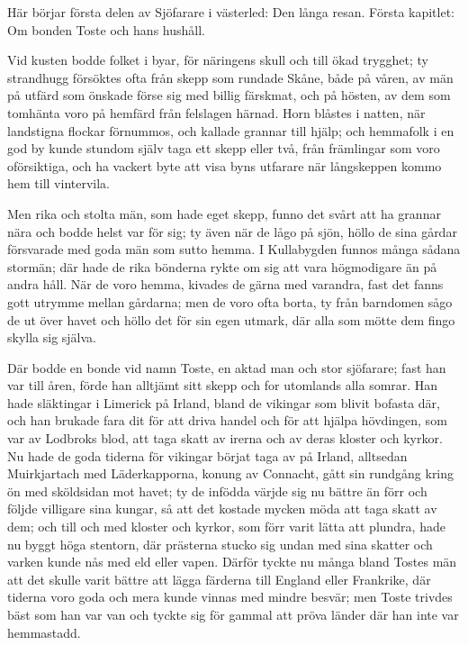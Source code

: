 \baselineskip

%
%


{%
\Red
Här börjar första delen av Sjöfarare i västerled: Den långa resan. Första kapitlet: Om bonden Toste och hans hushåll.%
}

\biginitial Vid kusten bodde folket i byar, för näringens skull och till ökad trygghet; ty strandhugg försöktes ofta från skepp som rundade Skåne, både på våren, av män på utfärd som önskade förse sig med billig färskmat, och på hösten, av dem som tomhänta voro på hemfärd från felslagen härnad. Horn blåstes i natten, när landstigna flockar förnummos, och kallade grannar till hjälp; och hemmafolk i en god by kunde stundom själv taga ett skepp eller två, från främlingar som voro oförsiktiga, och ha vackert byte att visa byns utfarare när långskeppen kommo hem till vintervila.

\initial Men rika och stolta män, som hade eget skepp, funno det svårt att ha grannar nära och bodde helst var för sig; ty även när de lågo på sjön, höllo de sina gårdar försvarade med goda män som sutto hemma. I Kullabygden funnos många sådana stormän; där hade de rika bönderna rykte om sig att vara högmodigare än på andra håll. När de voro hemma, kivades de gärna med varandra, fast det fanns gott utrymme mellan gårdarna; men de voro ofta borta, ty från barndomen sågo de ut över havet och höllo det för sin egen utmark, där alla som mötte dem fingo skylla sig själva.

\initial Där bodde en bonde vid namn Toste, en aktad man och stor sjöfarare; fast han var till åren, förde han alltjämt sitt skepp och for utomlands alla somrar. Han hade släktingar i Limerick på Irland, bland de vikingar som blivit bofasta där, och han brukade fara dit för att driva handel och för att hjälpa hövdingen, som var av Lodbroks blod, att taga skatt av irerna och av deras kloster och kyrkor. Nu hade de goda tiderna för vikingar börjat taga av på Irland, alltsedan Muirkjartach med Läderkapporna, konung av Connacht, gått sin rundgång kring ön med sköldsidan mot havet; ty de infödda värjde sig nu bättre än förr och följde villigare sina kungar, så att det kostade mycken möda att taga skatt av dem; och till och med kloster och kyrkor, som förr varit lätta att plundra, hade nu byggt höga stentorn, där prästerna stucko sig undan med sina skatter och varken kunde nås med eld eller vapen. Därför tyckte nu många bland Tostes män att det skulle varit bättre att lägga färderna till England eller Frankrike, där tiderna voro goda och mera kunde vinnas med mindre besvär; men Toste trivdes bäst som han var van och tyckte sig för gammal att pröva länder där han inte var hemmastadd.

